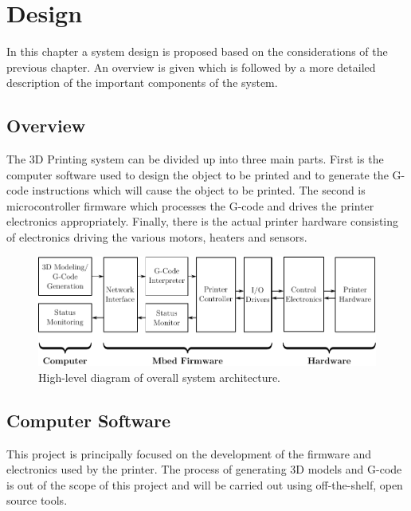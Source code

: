 \chapter{Design}
	
	\label{sec:design}
	
	
	In this chapter a system design is proposed based on the considerations of the
	previous chapter. An overview is given which is followed by a more detailed
	description of the important components of the system.
	
	
	\section{Overview}
		
		The 3D Printing system can be divided up into three main parts. First is the
		computer software used to design the object to be printed and to generate
		the G-code instructions which will cause the object to be printed. The
		second is microcontroller firmware which processes the G-code and drives the
		printer electronics appropriately. Finally, there is the actual printer
		hardware consisting of electronics driving the various motors, heaters and
		sensors.
		
		\begin{figure}[here]
			\includegraphics[width=1\textwidth]{diagrams/systemDiagramTop.pdf}
			\caption{High-level diagram of overall system architecture.}
			\label{fig:systemDiagramTop}
		\end{figure}
	
	\section{Computer Software}
		
		This project is principally focused on the development of the firmware and
		electronics used by the printer. The process of generating 3D models and
		G-code is out of the scope of this project and will be carried out using
		off-the-shelf, open source tools.
		
